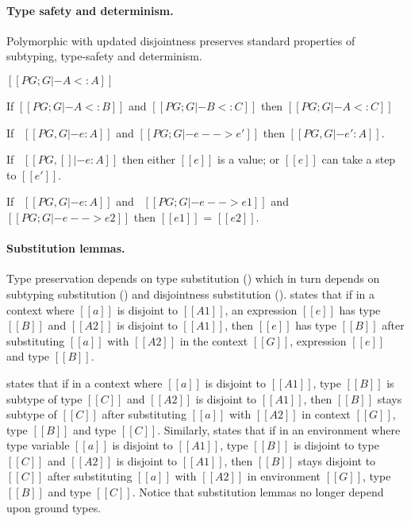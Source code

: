 \paragraph{Type safety and determinism.}
Polymorphic \name with updated disjointness preserves standard properties
of subtyping, type-safety and determinism.

\begin{lemma}
  $[[PG ; G |- A <: A]]$
\label{lemma:union:rev:poly:sub:refl}
\end{lemma}

\begin{lemma}
  If $[[PG ; G |- A <: B]]$ and $[[PG ; G |- B <: C]]$ then $[[PG ; G |- A <: C]]$
\label{lemma:union:rev:poly:sub:trans}
\end{lemma}

\begin{theorem}
\label{lemma:union:rev:poly:preservation}
  If \ $[[PG , G |- e : A]]$ and $[[PG ; G |- e --> e']]$ then $[[PG , G |- e' : A]]$.
\end{theorem}

\begin{theorem}[Progress]
\label{lemma:union:rev:poly:progress}
If \ $[[PG , [] |- e : A]]$ then either $[[e]]$ is a value;
or $[[e]]$ can take a step to $[[e']]$.
\end{theorem}

\begin{theorem}[Determinism]
\label{lemma:union:rev:poly:determinism}
  If \ $[[PG , G |- e : A]]$ and \ $[[PG ; G |- e --> e1]]$ and \ $[[PG ; G |- e --> e2]]$ then $[[e1]]$ = $[[e2]]$.
\end{theorem}

\paragraph{Substitution lemmas.}
Type preservation depends on type substitution 
() which
in turn depends on 
subtyping substitution () and
disjointness substitution ().
 states that if in a context
where $[[a]]$ is disjoint to $[[A1]]$,
an expression $[[e]]$ has type $[[B]]$ and
$[[A2]]$ is disjoint to $[[A1]]$, then
$[[e]]$ has type $[[B]]$ after substituting $[[a]]$
with $[[A2]]$ in the context $[[G]]$, expression $[[e]]$
and type $[[B]]$.

 states that if in a context
where $[[a]]$ is disjoint to $[[A1]]$,
type $[[B]]$ is subtype of type $[[C]]$ and
$[[A2]]$ is disjoint to $[[A1]]$, then
$[[B]]$ stays subtype of $[[C]]$ after substituting $[[a]]$
with $[[A2]]$ in context $[[G]]$, type $[[B]]$
and type $[[C]]$.
Similarly,  
states that if in an environment where type variable $[[a]]$
is disjoint to $[[A1]]$, type $[[B]]$ is disjoint to type $[[C]]$ and
$[[A2]]$ is disjoint to $[[A1]]$, then $[[B]]$ stays disjoint to $[[C]]$
after substituting $[[a]]$ with $[[A2]]$ in environment $[[G]]$,
type $[[B]]$ and type $[[C]]$.
Notice that substitution lemmas no longer depend upon ground types.


